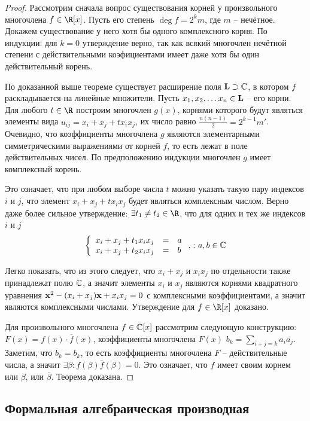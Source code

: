 \begin{proof}
  Рассмотрим сначала вопрос существования корней у произвольного многочлена $f\in\R[x]$. Пусть его степень $\deg f=2^km$, где $m$ -- нечётное. Докажем существование у него хотя бы одного комплексного корня. По индукции: для $k=0$ утверждение верно, так как всякий многочлен нечётной степени с действительными коэфициентами имеет даже хотя бы один действительный корень.
    
    По доказанной выше теореме существует расширение поля $\mathbf{L}\supset\mathbb{C}$, в котором $f$ раскладывается на линейные множители. Пусть $x_1,x_2,\dots x_n\in\mathbf{L}$ -- его корни. Для любого $t\in\R$ построим многочлен $g(x)$, корнями которого будут являться элементы вида $u_{ij}=x_i+x_j+tx_ix_j$, их число равно $\frac{n(n-1)}2=2^{k-1}m'$. Очевидно, что коэффициенты многочлена $g$ являются элементарными симметрическими выражениями от корней $f$, то есть лежат в поле действительных чисел. По предположению индукции многочлен $g$ имеет комплексный корень.
    
    Это означает, что при любом выборе числа $t$ можно указать такую пару индексов $i$ и $j$, что элемент $x_i+x_j+tx_ix_j$ будет являться комплексным числом. Верно даже более сильное утверждение: $\exists t_1\ne t_2\in\R$, что для одних и тех же индексов $i$ и $j$
    $$
    \left\{
      \begin{array}{lll}
        x_i+x_j+t_1x_ix_j&=&a\\
        x_i+x_j+t_2x_ix_j&=&b
      \end{array}\right.,\colon a,b\in\mathbb{C}
    $$
    
    Легко показать, что из этого следует, что $x_i+x_j$ и $x_ix_j$ по отдельности также принадлежат полю $\mathbb{C}$, а значит элементы $x_i$ и $x_j$ являются корнями квадратного уравнения $\xb^2\bw-(x_i\bw+x_j)\xb\bw+x_ix_j\bw=0$ с комплексными коэффициентами, а значит являются комплексными числами. Утверждение для $f\in\R[x]$ доказано.
    
    Для произвольного многочлена $f\in\mathbb{C}[x]$ рассмотрим следующую конструкцию: $F(x)=f(x)\cdot\overline{f}(x)$, коэффициенты многочлена $F(x)$ $b_k=\sum\limits_{i+j=k}a_i\overline{a_j}$. Заметим, что $\overline{b}_k=b_k$, то есть коэффициенты многочлена $F$ -- действительные числа, а значит $\exists\beta\colon f(\beta)\overline{f}(\beta)=0$. Это означает, что $f$ имеет своим корнем или $\beta$, или $\overline\beta$. Теорема доказана.
\end{proof}

\subsection{Формальная алгебраическая производная}

